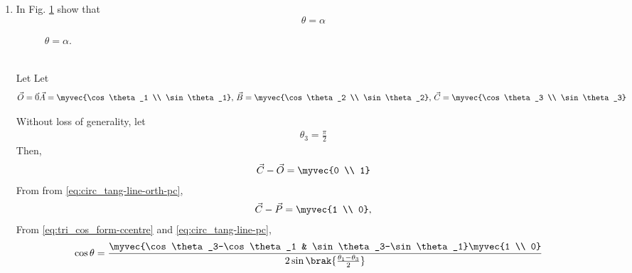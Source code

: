 \begin{enumerate}[label=\thesection.\arabic*.,ref=\thesection.\theenumi]
\item
In Fig. \ref{fig:circ_tang_icept} show that 
%
\begin{equation}
\theta = \alpha
		\label{fig:circ_tang_icept-equal}	
\end{equation}
%
\label{them:tang_icept_ang}
	\begin{figure}[!ht]
		\begin{center}
			
			\resizebox{\columnwidth}{!}{}
		\end{center}
		\caption{$\theta= \alpha$.}
		\label{fig:circ_tang_icept}	
	\end{figure}
	\\
	\solution
	Let 
    Let
  \begin{align}
	  \vec{O} = \vec{0}
	  \vec{A} = \myvec{\cos \theta_1 \\ \sin \theta_1},\,
	  \vec{B} =  \myvec{\cos \theta_2 \\ \sin \theta_2},\,
	  \vec{C} =  \myvec{\cos \theta_3 \\ \sin \theta_3}
  \end{align}
  \iffalse
  From 
\eqref{eq:tri_ccentre_subtend-temp}
  \begin{align}
	  \cos \alpha = \cos\brak{ \frac{\theta_1-\theta_3}{2}  }
		\label{eq:circ_tang-line-alpha}	
  \end{align}
  \fi
  Without loss of generality,  let 
  \begin{align}
	  \theta_3 = \frac{\pi}{2}
		\label{eq:circ_tang-line-t3}	
  \end{align}
  Then, 
  \begin{align}
	  \vec{C}-\vec{O} = \myvec{0 \\ 1}
  \end{align}
  From 
		from \eqref{eq:circ_tang-line-orth-pc},	
  \begin{align}
	  \vec{C}-\vec{P} = \myvec{1 \\ 0}
		\label{eq:circ_tang-line-pc},	
  \end{align}
From   
\eqref{eq:tri_cos_form-ccentre}
and 
		\eqref{eq:circ_tang-line-pc},	
  \begin{align}
	  \cos \theta &= \frac{
		  \myvec{\cos \theta_3-\cos \theta_1 & \sin \theta_3-\sin \theta_1}
		  \myvec{1 \\ 0}
		  }
		  {
	   2 \sin \brak{\frac{\theta_1-\theta_3}{2}}
}
\end{align}
\end{enumerate}
